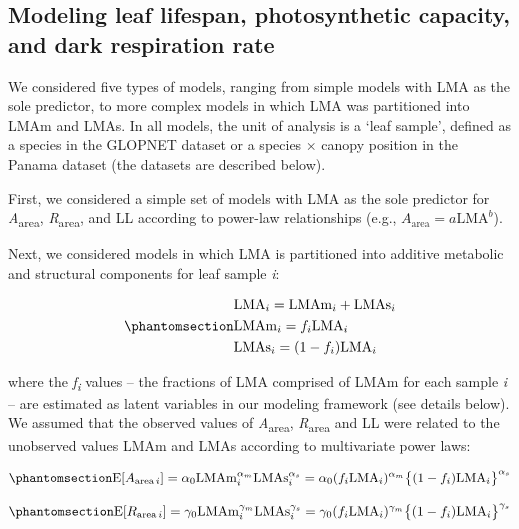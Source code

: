 \documentclass[
  12pt,
  letterpaper,
  DIV=11,
  numbers=noendperiod]{scrartcl}
\begin{document}
\subsection{Modeling leaf lifespan, photosynthetic capacity, and dark
respiration
rate}\label{modeling-leaf-lifespan-photosynthetic-capacity-and-dark-respiration-rate}

We considered five types of models, ranging from simple models with LMA
as the sole predictor, to more complex models in which LMA was
partitioned into LMAm and LMAs. In all models, the unit of analysis is a
`leaf sample', defined as a species in the GLOPNET dataset or a species
\(\times\) canopy position in the Panama dataset (the datasets are
described below).

First, we considered a simple set of models with LMA as the sole
predictor for \emph{A}\textsubscript{area},
\emph{R}\textsubscript{area}, and LL according to power-law
relationships (e.g., \(A_{\mathrm{area}} = a\mathrm{LMA}^b\)).

Next, we considered models in which LMA is partitioned into additive
metabolic and structural components for leaf sample \emph{i}:

\begin{equation}\phantomsection\label{eq-LMA}{
\begin{aligned}
  &\mathrm{LMA}_{i} =\mathrm{LMAm}_{i} + \mathrm{LMAs}_{i} \\
  &\mathrm{LMAm}_{i} = f_{i} \mathrm{LMA}_{i} \\
  &\mathrm{LMAs}_{i} = (1 - f_{i})  \mathrm{LMA}_{i}
\end{aligned}
}\end{equation}

where the \emph{f\textsubscript{i}} values -- the fractions of LMA
comprised of LMAm for each sample \emph{i} -- are estimated as latent
variables in our modeling framework (see details below). We assumed that
the observed values of \emph{A}\textsubscript{area},
\emph{R}\textsubscript{area} and LL were related to the unobserved
values LMAm and LMAs according to multivariate power laws:

\begin{equation}\phantomsection\label{eq-Aarea}{
\mathrm{E}[A_{\mathrm{area} \, i}]
= \alpha_0\mathrm{LMAm}_{i}^{\alpha_m}\mathrm{LMAs}_i^{\alpha_s}  =  \alpha_0 (f_i \mathrm{LMA}_{i})^{\alpha_m} \bigl\{(1-f_i) \mathrm{LMA}_{i}\bigr\}^{\alpha_s}
}\end{equation}

\begin{equation}\phantomsection\label{eq-Rarea}{
\mathrm{E}[R_{\mathrm{area} \, i}]
= \gamma_0\mathrm{LMAm}_{i}^{\gamma_m} \mathrm{LMAs}_{i}^{\gamma_s}
= \gamma_0 (f_i \mathrm{LMA}_{i})^{\gamma_m} \bigl\{(1-f_i)\mathrm{LMA}_{i}\bigr\}^{\gamma_s}
}\end{equation}
\end{document}
